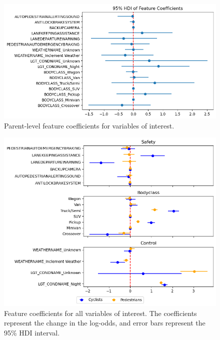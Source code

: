 \documentclass[12pt]{article}
\begin{document}
\begin{figure}[h]
    \centering
    \includegraphics[width=\textwidth]{images/all_users_coefficients.png}
    \caption{Parent-level feature coefficients for variables of interest.}
    \label{fig:all_users}
\end{figure}


\begin{figure}[h]
    \centering
    \includegraphics[width=\textwidth]{images/feature_coefficients.png}
    \caption{Feature coefficients for all variables of interest. The coefficients represent the change in the log-odds,
        and error bars represent the 95\% HDI interval.}
    \label{fig:coefficients}
\end{figure}
\end{document}
